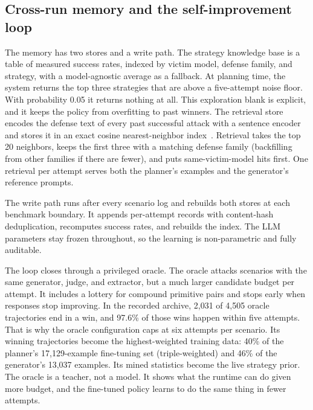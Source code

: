 \subsection{Cross-run memory and the self-improvement loop}
\label{sec:memory}
The memory has two stores and a write path. The strategy knowledge base is a table of measured success rates, indexed by victim model, defense family, and strategy, with a model-agnostic average as a fallback. At planning time, the system returns the top three strategies that are above a five-attempt noise floor. With probability 0.05 it returns nothing at all. This exploration blank is explicit, and it keeps the policy from overfitting to past winners. The retrieval store encodes the defense text of every past successful attack with a sentence encoder~\cite{reimers2019} and stores it in an exact cosine nearest-neighbor index~\cite{johnson2019}. Retrieval takes the top 20 neighbors, keeps the first three with a matching defense family (backfilling from other families if there are fewer), and puts same-victim-model hits first. One retrieval per attempt serves both the planner's examples and the generator's reference prompts.

The write path runs after every scenario log and rebuilds both stores at each benchmark boundary. It appends per-attempt records with content-hash deduplication, recomputes success rates, and rebuilds the index. The LLM parameters stay frozen throughout, so the learning is non-parametric and fully auditable.

The loop closes through a privileged oracle. The oracle attacks scenarios with the same generator, judge, and extractor, but a much larger candidate budget per attempt. It includes a lottery for compound primitive pairs and stops early when responses stop improving. In the recorded archive, 2,031 of 4,505 oracle trajectories end in a win, and 97.6\% of those wins happen within five attempts. That is why the oracle configuration caps at six attempts per scenario. Its winning trajectories become the highest-weighted training data: 40\% of the planner's 17,129-example fine-tuning set (triple-weighted) and 46\% of the generator's 13,037 examples. Its mined statistics become the live strategy prior. The oracle is a teacher, not a model. It shows what the runtime can do given more budget, and the fine-tuned policy learns to do the same thing in fewer attempts.
